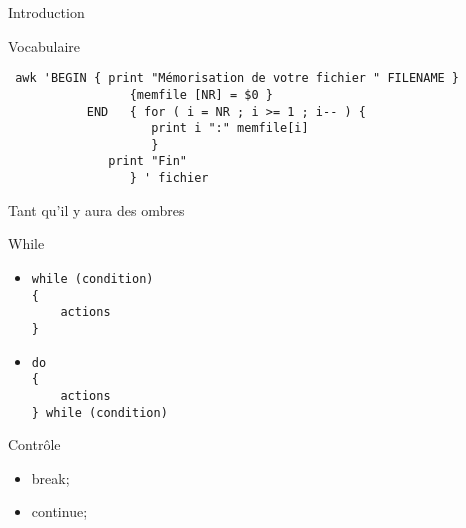 \def\ftitle{Introduction}
\begin{frame}[containsverbatim]{\ftitle}
\def\blocktitle{Vocabulaire}
\begin{block}{\blocktitle}
\begin{verbatim}
 awk 'BEGIN { print "Mémorisation de votre fichier " FILENAME }
                 {memfile [NR] = $0 }
           END   { for ( i = NR ; i >= 1 ; i-- ) {
                    print i ":" memfile[i]
                    }
	          print "Fin"
                 } ' fichier 
\end{verbatim}%
\end{block}
\end{frame}


\def\ftitle{Tant qu'il y aura des ombres}
\begin{frame}[containsverbatim]{\ftitle}
\def\blocktitle{While}
\begin{block}{\blocktitle}
\begin{itemize}
\item \begin{verbatim}
while (condition)
{
	actions
}
\end{verbatim}
\item \begin{verbatim}
do
{
	actions
} while (condition)
\end{verbatim}
\end{itemize}
\end{block}
\def\blocktitle{Contrôle}
\begin{block}{\blocktitle}
\begin{itemize}
\item break;
\item continue;
\end{itemize}
\end{block}
\end{frame}



